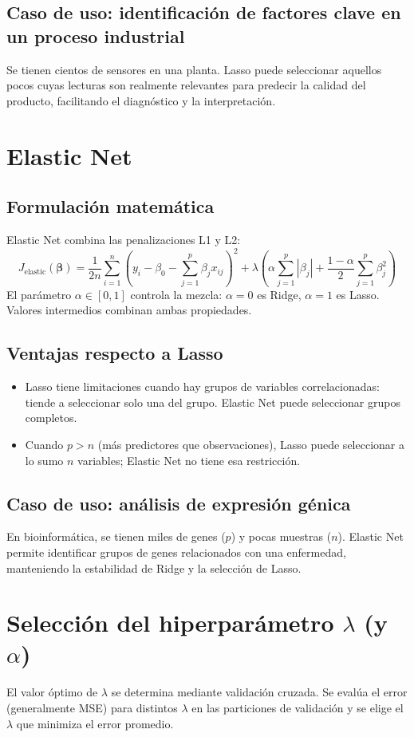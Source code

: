 \documentclass[12pt,a4paper,openany,oneside]{book}
\begin{document}
\subsection{Caso de uso: identificación de factores clave en un proceso industrial}
Se tienen cientos de sensores en una planta. Lasso puede seleccionar aquellos pocos cuyas lecturas son realmente relevantes para predecir la calidad del producto, facilitando el diagnóstico y la interpretación.

\section{Elastic Net}
\subsection{Formulación matemática}
Elastic Net combina las penalizaciones L1 y L2:
\[
J_{\text{elastic}}(\boldsymbol{\beta}) = \frac{1}{2n} \sum_{i=1}^n (y_i - \beta_0 - \sum_{j=1}^p \beta_j x_{ij})^2 + \lambda \left( \alpha \sum_{j=1}^p |\beta_j| + \frac{1-\alpha}{2} \sum_{j=1}^p \beta_j^2 \right)
\]
El parámetro \(\alpha \in [0,1]\) controla la mezcla: \(\alpha = 0\) es Ridge, \(\alpha = 1\) es Lasso. Valores intermedios combinan ambas propiedades.

\subsection{Ventajas respecto a Lasso}
\begin{itemize}
    \item Lasso tiene limitaciones cuando hay grupos de variables correlacionadas: tiende a seleccionar solo una del grupo. Elastic Net puede seleccionar grupos completos.
    \item Cuando \(p > n\) (más predictores que observaciones), Lasso puede seleccionar a lo sumo \(n\) variables; Elastic Net no tiene esa restricción.
\end{itemize}

\subsection{Caso de uso: análisis de expresión génica}
En bioinformática, se tienen miles de genes (\(p\)) y pocas muestras (\(n\)). Elastic Net permite identificar grupos de genes relacionados con una enfermedad, manteniendo la estabilidad de Ridge y la selección de Lasso.

\section{Selección del hiperparámetro \(\lambda\) (y \(\alpha\))}
El valor óptimo de \(\lambda\) se determina mediante validación cruzada. Se evalúa el error (generalmente MSE) para distintos \(\lambda\) en las particiones de validación y se elige el \(\lambda\) que minimiza el error promedio.
\end{document}
